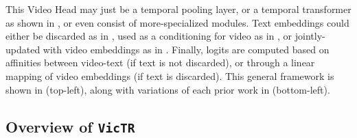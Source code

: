 \documentclass[10pt,twocolumn,letterpaper]{article}
\newcommand{\ours}{\texttt{VicTR}}
\begin{document}
This Video Head may just be a temporal pooling layer, or a temporal transformer as shown in \cite{luo2022clip4clip, wang2021actionclip}, or even consist of more-specialized modules. Text embeddings could either be discarded as in \cite{lin2022evl}, used as a conditioning for video as in \cite{bain2022cliphitchhiker}, or jointly-updated with video embeddings as in \cite{ma2022xclip}. Finally, logits are computed based on affinities between video-text (if text is not discarded), or through a linear mapping of video embeddings (if text is discarded). This general framework is shown in  (top-left), along with variations of each prior work in (bottom-left).

\subsection{Overview of \bf\ours}
\end{document}

